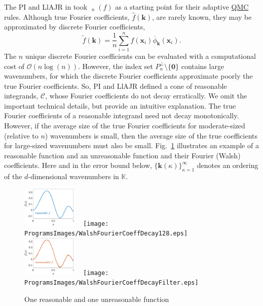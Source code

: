 \documentclass[11pt]{NSFamsart}
\newcommand{\QMC}{\hyperlink{QMClink}{QMC}\xspace}
\newcommand{\hf}{\widehat{f}}
\newcommand{\tf}{\widetilde{f}}
\newcommand{\bbK}{\mathbb{K}}
\DeclareMathOperator{\err}{err}
\DeclareMathOperator{\oerr}{\overline{\err}}
\newcommand{\bzero}{\boldsymbol{0}}
\newcommand{\bx}{{\boldsymbol{x}}}
\newcommand{\bk}{{\boldsymbol{k}}}
\newcommand{\cc}{\mathcal{C}}
\newcommand{\Order}{\mathcal{O}}
\begin{document}
The PI and LlAJR in \cite{HicJim16a,JimHic16a} took $\oerr_n(f)$ as a starting point for their 
adaptive \QMC rules.   Although true Fourier 
coefficients, $\hf(\bk)$, are rarely 
known, they may be approximated 
by discrete Fourier coefficients,
\begin{equation*}
\tf(\bk)  = \frac{1}n \sum_{i=1}^{n} f(\bx_i) \overline{\phi}_{\bk}(\bx_i).
\end{equation*}
The $n$ unique discrete Fourier coefficients can be evaluated with a computational cost of 
$\Order(n \log(n))$.  However, the index set $P^\perp_n \setminus\{\bzero\}$ contains large 
wavenumbers, for which the discrete Fourier coefficients approximate poorly the true Fourier 
coefficients.  So, PI and LlAJR defined a cone of reasonable integrands, $\cc$, 
whose Fourier coefficients do not decay erratically.  We omit the important technical details, but 
provide an intuitive explanation.  The true Fourier coefficients of a reasonable integrand
need not decay monotonically.  However, if the average size of the true Fourier coefficients for 
moderate-sized (relative to $n$) wavenumbers is small, then the average size of the true 
coefficients for large-sized wavenumbers must also be small.  Fig.\ \ref{GoodBadWalshFig} 
illustrates an example of a reasonable function and an unreasonable function and their Fourier 
(Walsh) coefficients.  Here and in the error bound below, $\{\bk(\kappa)\}_{\kappa = 1}^\infty$ 
denotes an ordering of 
the $d$-dimensional wavenumbers in $\bbK$.

\begin{figure}[h]
	\centering
	\includegraphics[width = 0.23\textwidth] 
	{ProgramsImages/FunctionWalshFourierCoeffDecay.eps} \ \ 
	\texttt{[image: ProgramsImages/WalshFourierCoeffDecay128.eps]} \ \ 
	\includegraphics[width = 0.23\textwidth] 
	{ProgramsImages/FilteredFunctionWalshFourierCoeffDecay.eps} \ \ 
	\texttt{[image: ProgramsImages/WalshFourierCoeffDecayFilter.eps]}
	\caption{One reasonable and one unreasonable function 
	\label{GoodBadWalshFig}}
\end{figure}
\end{document}
